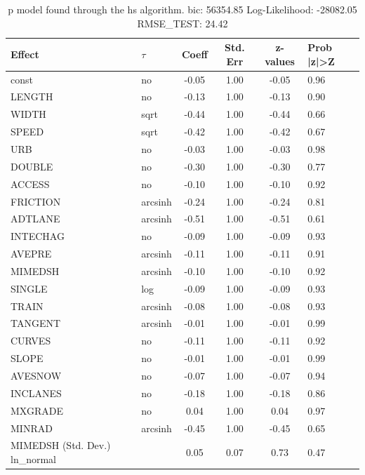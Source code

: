 \begin{table}
	\caption{p model found through the hs algorithm. bic: 56354.85 Log-Likelihood: -28082.05 RMSE_TEST: 24.42}
	\begin{center}
		\begin{tabular}{|l|l|c|c|c|l|}
			\hline
			Effect & $\tau$ & Coeff & Std. Err & z-values & Prob |z|>Z \\
			\hline
			const & no & -0.05 & 1.00 & -0.05 & 0.96 \\
			\hline
			LENGTH & no & -0.13 & 1.00 & -0.13 & 0.90 \\
			\hline
			WIDTH & sqrt & -0.44 & 1.00 & -0.44 & 0.66 \\
			\hline
			SPEED & sqrt & -0.42 & 1.00 & -0.42 & 0.67 \\
			\hline
			URB & no & -0.03 & 1.00 & -0.03 & 0.98 \\
			\hline
			DOUBLE & no & -0.30 & 1.00 & -0.30 & 0.77 \\
			\hline
			ACCESS & no & -0.10 & 1.00 & -0.10 & 0.92 \\
			\hline
			FRICTION & arcsinh & -0.24 & 1.00 & -0.24 & 0.81 \\
			\hline
			ADTLANE & arcsinh & -0.51 & 1.00 & -0.51 & 0.61 \\
			\hline
			INTECHAG & no & -0.09 & 1.00 & -0.09 & 0.93 \\
			\hline
			AVEPRE & arcsinh & -0.11 & 1.00 & -0.11 & 0.91 \\
			\hline
			MIMEDSH & arcsinh & -0.10 & 1.00 & -0.10 & 0.92 \\
			\hline
			SINGLE & log & -0.09 & 1.00 & -0.09 & 0.93 \\
			\hline
			TRAIN & arcsinh & -0.08 & 1.00 & -0.08 & 0.93 \\
			\hline
			TANGENT & arcsinh & -0.01 & 1.00 & -0.01 & 0.99 \\
			\hline
			CURVES & no & -0.11 & 1.00 & -0.11 & 0.92 \\
			\hline
			SLOPE & no & -0.01 & 1.00 & -0.01 & 0.99 \\
			\hline
			AVESNOW & no & -0.07 & 1.00 & -0.07 & 0.94 \\
			\hline
			INCLANES & no & -0.18 & 1.00 & -0.18 & 0.86 \\
			\hline
			MXGRADE & no & 0.04 & 1.00 & 0.04 & 0.97 \\
			\hline
			MINRAD & arcsinh & -0.45 & 1.00 & -0.45 & 0.65 \\
			\hline
			MIMEDSH (Std. Dev.) ln_normal &  & 0.05 & 0.07 & 0.73 & 0.47 \\

\end{tabular}
\end{center}
\end{table}
